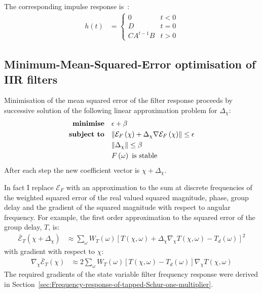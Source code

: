 \documentclass[a4paper,twoside,10pt,english]{article}
\DeclarePairedDelimiter{\mathnorm}{\lVert}{\rVert}
\begin{document}
The corresponding impulse response
is~\cite[Equation 8.3.21]{RobertsMullis_DigitalSignalProcessing}:
\begin{align*}
h\left(t\right) &= \begin{cases}
0 & t<0\\
D & t=0\\
CA^{t-1}B & t>0
\end{cases}
\end{align*}

\subsection{Minimum-Mean-Squared-Error optimisation of IIR filters}
Minimisation of the mean squared error of the filter response proceeds by
successive solution of the following linear approximation problem
for $\Delta_{\chi}$:
\begin{align}
\begin{split}
  \textbf{minimise}\quad & \epsilon+\beta \\
  \textbf{subject to}\quad & \mathnorm{\mathcal{E}_{F}\left(\chi\right) +
          \Delta_{\chi}\nabla\mathcal{E}_{F}\left(\chi\right)}\le\epsilon \\
  & \mathnorm{\Delta_{\chi}}\le\beta \\
  & F\left(\omega\right)\text{ is stable}
\end{split}
\label{eqn:Optimisation-of-minimum-mean-squared-response-error}
\end{align}
After each step the new coefficient vector is $\chi+\Delta_{\chi}$. 

In fact I replace $\mathcal{E}_{F}$ with an approximation to the sum at discrete
frequencies of the weighted squared error of the real valued squared magnitude,
phase, group delay and the gradient of the squared magnitude with respect to
angular frequency. For example, the first order approximation to the squared
error of the group delay, $T$, is:
\begin{align*}
  \bar{\mathcal{E}}_{T}\left(\chi+\Delta_{\chi}\right)
  &\approx \sum_{\omega} W_{T}\left(\omega\right)
     \left[T\left(\chi,\omega\right) + \right.
    \left. \Delta_{\chi}\nabla_{\chi}T\left(\chi,\omega\right) - \right.
    \left. T_{d}\left(\omega\right)\right]^{2}
\end{align*}
with gradient with respect to $\chi$:
\begin{align*}
  \nabla_{\chi} \bar{\mathcal{E}}_{T}\left(\chi\right)
  &\approx 2 \sum_{\omega} W_{T}\left(\omega\right)
    \left[T\left(\chi,\omega\right)-T_{d}\left(\omega\right)\right]
    \nabla_{\chi}T\left(\chi,\omega\right)
\end{align*}
The required gradients of the state variable filter frequency response were
derived in Section~\ref{sec:Frequency-response-of-tapped-Schur-one-multiplier}.
\end{document}
